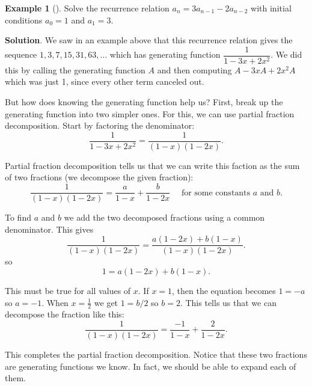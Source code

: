 \documentclass[10pt,]{book}
\theoremstyle{plain}
\theoremstyle{definition}
\theoremstyle{definition}
\newtheorem{example}[theorem]{Example}
\theoremstyle{definition}
\theoremstyle{definition}
\numberwithin{equation}{chapter}
\begin{document}
\begin{example}[]\label{example-27}
\hypertarget{p-1000}{}%
Solve the recurrence relation \(a_n = 3a_{n-1} - 2a_{n-2}\) with initial conditions \(a_0 = 1\) and \(a_1 = 3\).%
\par\smallskip%
\noindent\textbf{Solution}.\hypertarget{solution-99}{}\quad%
\hypertarget{p-1001}{}%
We saw in an example above that this recurrence relation gives the sequence \(1, 3, 7, 15, 31, 63, \ldots\) which has generating function \(\dfrac{1}{1 - 3x + 2x^2}\). We did this by calling the generating function \(A\) and then computing \(A - 3xA + 2x^2A\) which was just 1, since every other term canceled out.%
\par
\hypertarget{p-1002}{}%
But how does knowing the generating function help us? First, break up the generating function into two simpler ones. For this, we can use partial fraction decomposition. Start by factoring the denominator:%
\begin{equation*}
\frac{1}{1-3x + 2x^2} = \frac{1}{(1-x)(1-2x)}.
\end{equation*}
%
\par
\hypertarget{p-1003}{}%
Partial fraction decomposition tells us that we can write this faction as the sum of two fractions (we decompose the given fraction):%
\begin{equation*}
\frac{1}{(1-x)(1-2x)} = \frac{a}{1-x} + \frac{b}{1-2x} \text{ ~~ for some constants } a \text{ and } b.
\end{equation*}
%
\par
\hypertarget{p-1004}{}%
To find \(a\) and \(b\) we add the two decomposed fractions using a common denominator. This gives%
\begin{equation*}
\frac{1}{(1-x)(1-2x)} = \frac{a(1-2x) + b(1-x)}{(1-x)(1-2x)}.
\end{equation*}
so%
\begin{equation*}
1 = a(1-2x) + b(1-x).
\end{equation*}
%
\par
\hypertarget{p-1005}{}%
This must be true for all values of \(x\). If \(x = 1\), then the equation becomes \(1 = -a\) so \(a = -1\). When \(x = \frac{1}{2}\) we get \(1 = b/2\) so \(b = 2\). This tells us that we can decompose the fraction like this:%
\begin{equation*}
\frac{1}{(1-x)(1-2x)} = \frac{-1}{1-x} + \frac{2}{1-2x}.
\end{equation*}
%
\par
\hypertarget{p-1006}{}%
This completes the partial fraction decomposition. Notice that these two fractions are generating functions we know. In fact, we should be able to expand each of them.%

\end{example}
\end{document}
